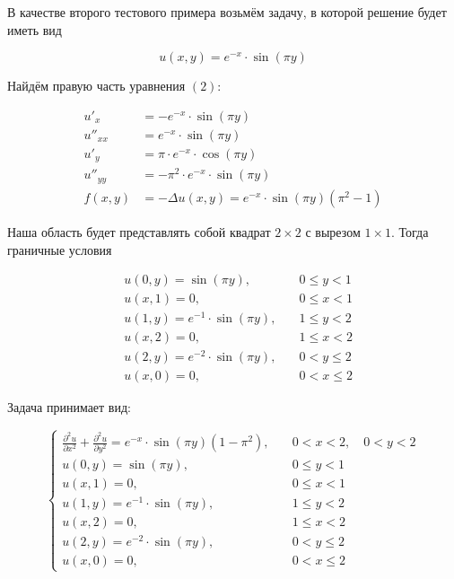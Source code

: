 \documentclass[a4paper, 12pt]{article} %
\begin{document}
В качестве второго тестового примера возьмём задачу, в которой решение будет иметь вид 

\[ u(x, y) = e^{-x} \cdot \sin{(\pi y)} \]

Найдём правую часть уравнения $ (2) $:

\[
\begin{aligned}
u'_x &= - e^{-x} \cdot \sin{(\pi y)} \\
u''_{xx} &= e^{-x} \cdot \sin{(\pi y)} \\
u'_y &= \pi \cdot e^{-x} \cdot \cos{(\pi y)} \\
u''_{yy} &= - \pi^2 \cdot e^{-x} \cdot \sin{(\pi y)} \\
f(x, y) &= - \Delta u(x, y) = e^{-x} \cdot \sin{(\pi y)} (\pi^2 - 1)
\end{aligned}
\]

Наша область будет представлять собой квадрат $ 2 \times 2 $ с вырезом $ 1 \times 1 $. Тогда граничные условия

\[
\begin{aligned}
&u(0, y) = \sin{(\pi y)}, \quad &0 \leq y < 1 \\
&u(x, 1) = 0, \quad &0 \leq x < 1 \\
&u(1, y) = e^{-1} \cdot \sin{(\pi y)}, \quad &1 \leq y < 2 \\
&u(x, 2) = 0, \quad &1 \leq x < 2 \\
&u(2, y) = e^{-2} \cdot \sin{(\pi y)}, \quad &0 < y \leq 2 \\
&u(x, 0) = 0, \quad &0 < x \leq 2
\end{aligned}
\]

Задача принимает вид:

\begin{equation}
\begin{cases}
\frac{\partial^2 u}{\partial x^2} + \frac{\partial^2 u}{\partial y^2} = e^{-x} \cdot \sin{(\pi y)} (1 - \pi^2), \quad &0 < x < 2, \quad 0 < y < 2 \\
u(0, y) = \sin{(\pi y)}, \quad &0 \leq y < 1 \\
u(x, 1) = 0, \quad &0 \leq x < 1 \\
u(1, y) = e^{-1} \cdot \sin{(\pi y)}, \quad &1 \leq y < 2 \\
u(x, 2) = 0, \quad &1 \leq x < 2 \\
u(2, y) = e^{-2} \cdot \sin{(\pi y)}, \quad &0 < y \leq 2 \\
u(x, 0) = 0, \quad &0 < x \leq 2
\end{cases}
\end{equation}
\end{document}
